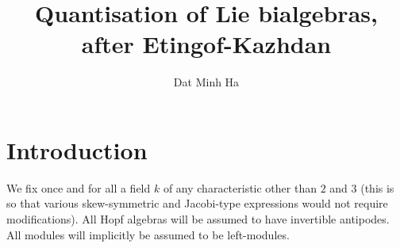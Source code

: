 

\setcounter{section}{-1}





    \title{Quantisation of Lie bialgebras, after Etingof-Kazhdan}
    
    \author{Dat Minh Ha}
    \maketitle
    
    \begin{abstract}
    
    \end{abstract}
    
    {
    \hypersetup{} 
    \tableofcontents %
    }

    \listoftodos

    \section{Introduction}
        \begin{convention}
            We fix once and for all a field $k$ of any characteristic other than $2$ and $3$ (this is so that various skew-symmetric and Jacobi-type expressions would not require modifications). All Hopf algebras will be assumed to have invertible antipodes. All modules will implicitly be assumed to be left-modules.
        \end{convention}

    

    

    

    

    

    \begin{appendices}
        
    \end{appendices}
    
    \printbibliography

